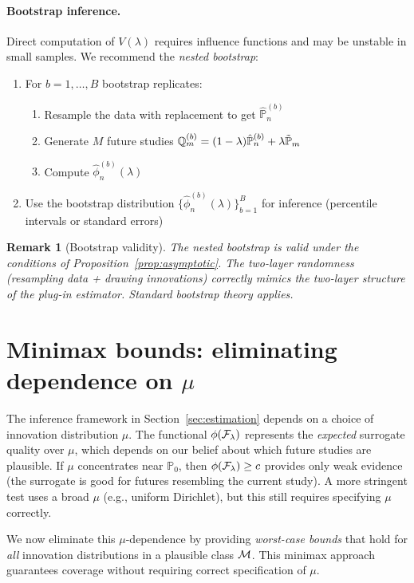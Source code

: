 \documentclass{article}
\newtheorem{remark}{Remark}
\newcommand{\PP}{\mathbb{P}}
\begin{document}
\paragraph{Bootstrap inference.}
Direct computation of $V(\lambda)$ requires influence functions and may be
unstable in small samples. We recommend the \textit{nested bootstrap}:
\begin{enumerate}
    \item For $b = 1, \ldots, B$ bootstrap replicates:
          \begin{enumerate}
              \item Resample the data with replacement to get $\hat{\PP}_n^{(b)}$
              \item Generate $M$ future studies $\Q_m^{(b)} = (1-\lambda)\hat{\PP}_n^{(b)} + \lambda\tilde{\PP}_m$
              \item Compute $\hat{\phi}_n^{(b)}(\lambda)$
          \end{enumerate}
    \item Use the bootstrap distribution $\{\hat{\phi}_n^{(b)}(\lambda)\}_{b=1}^B$
          for inference (percentile intervals or standard errors)
\end{enumerate}

\begin{remark}[Bootstrap validity]
The nested bootstrap is valid under the conditions of Proposition~\ref{prop:asymptotic}.
The two-layer randomness (resampling data + drawing innovations) correctly
mimics the two-layer structure of the plug-in estimator. Standard bootstrap
theory applies.
\end{remark}

\section{Minimax bounds: eliminating dependence on $\mu$}\label{sec:minimax}

The inference framework in Section~\ref{sec:estimation} depends on a choice of innovation distribution $\mu$. The functional $\phi(\mathcal{F}_\lambda)$ represents the \emph{expected} surrogate quality over $\mu$, which depends on our belief about which future studies are plausible. If $\mu$ concentrates near $\PP_0$, then $\phi(\mathcal{F}_\lambda) \geq c$ provides only weak evidence (the surrogate is good for futures resembling the current study). A more stringent test uses a broad $\mu$ (e.g., uniform Dirichlet), but this still requires specifying $\mu$ correctly.

We now eliminate this $\mu$-dependence by providing \emph{worst-case bounds} that hold for \emph{all} innovation distributions in a plausible class $\mathcal{M}$. This minimax approach guarantees coverage without requiring correct specification of $\mu$.
\end{document}
